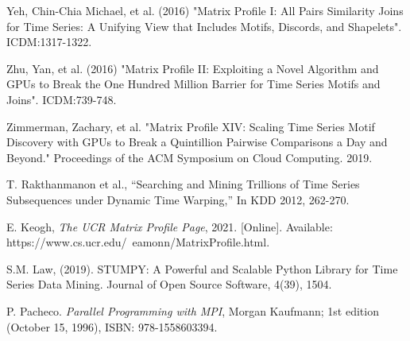 \documentclass[conference]{IEEEtran}
\begin{document}






\begin{thebibliography}{7}  

 Yeh, Chin-Chia Michael, et al. (2016) "Matrix Profile I: All Pairs Similarity Joins for Time Series: A Unifying View that Includes Motifs, Discords, and Shapelets". ICDM:1317-1322.

 Zhu, Yan, et al. (2016) "Matrix Profile II: Exploiting a Novel Algorithm and GPUs to Break the One Hundred Million Barrier for Time Series Motifs and Joins". ICDM:739-748.

 Zimmerman, Zachary, et al. "Matrix Profile XIV: Scaling Time Series Motif Discovery with GPUs to Break a Quintillion Pairwise Comparisons a Day and Beyond." Proceedings of the ACM Symposium on Cloud Computing. 2019.

 T. Rakthanmanon et al., “Searching and Mining Trillions of Time Series Subsequences under Dynamic Time Warping,” In KDD 2012, 262-270.

 E. Keogh, \emph{The UCR Matrix Profile Page}, 2021. [Online]. Available: https://www.cs.ucr.edu/~eamonn/MatrixProfile.html.

 S.M. Law, (2019). STUMPY: A Powerful and Scalable Python Library for Time Series Data Mining. Journal of Open Source Software, 4(39), 1504.

 P. Pacheco. \emph{Parallel Programming with MPI}, Morgan Kaufmann; 1st edition (October 15, 1996), ISBN: 978-1558603394.

\end{thebibliography}
\end{document}
